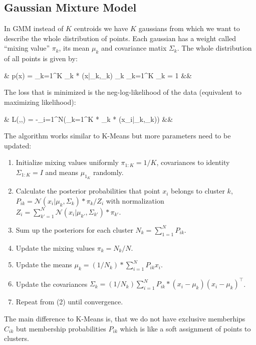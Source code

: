 \documentclass[12pt]{article}
\newcommand{\eqnsnn}[1]{\begin{flalign*} #1 \end{flalign*}}
\newcommand{\T}{^\top}
\newcommand{\mathtext}[1]{\quad\text{#1}\quad}
\newcommand{\with}{\mathtext{with}}
\begin{document}
\subsection{Gaussian Mixture Model}
In GMM instead of $K$ centroids we have $K$ gaussians from which we want to describe the whole distribution of points.
Each gaussian has a weight called \enquote{mixing value} $\pi_k$, its mean $\mu_k$ and covariance matix $\Sigma_k$.
The whole distribution of all points is given by:
\eqnsnn{&
p(x) = \sum_{k=1}^K \pi_k * (x|\mu_k,\Sigma_k) \with 0 \leq\pi_k \leq 1 \mathtext{and} \sum_{k=1}^K \pi_k = 1
&&}
The loss that is minimized is the neg-log-likelihood of the data (equivalent to maximizing likelihood):
\eqnsnn{&
L(\mu,\Sigma,\pi) = -\sum_{i=1}^N\ln\Big(\sum_{k=1}^K * \pi_k * \mathcal{N}(x_i|\mu_k,\Sigma_k)\Big)
&&}
The algorithm works similar to K-Means but more parameters need to be updated:
\begin{enumerate}
\item Initialize mixing values uniformly $\pi_{1:K} = 1/K$, covariances to identity $\Sigma_{1:K}=I$ and means $\mu_{1_K}$ randomly.
\item Calculate the posterior probabilities that point $x_i$ belongs to cluster $k$, $P_{ik} = \mathcal{N}(x_i|\mu_k,\Sigma_k)*\pi_k/Z_i$ with normalization $Z_i=\sum_{k'=1}^N\mathcal{N}(x_i|\mu_{k'},\Sigma_{k'})*\pi_{k'}$.
\item Sum up the posteriors for each cluster $N_k = \sum_{1=1}^N P_{ik}$.
\item Update the mixing values $\pi_k = N_k/N$.
\item Update the means $\mu_k = (1/N_k) * \sum_{i=1}^N P_{ik} x_i$.
\item Update the covariances $\Sigma_k = (1/N_k) \sum_{i=1}^N P_{ik} * (x_i-\mu_k)(x_i-\mu_k)\T$.
\item Repeat from (2) until convergence.
\end{enumerate}
The main difference to K-Means is, that we do not have exclusive memberhips $C_{ik}$ but membership probabilities $P_{ik}$ which is like a soft assignment of points to clusters.
\end{document}
